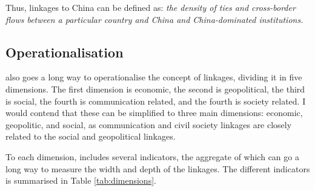 Thus, linkages to China can be defined as: \textit{the density of ties and cross-border flows between a particular country and China and China-dominated institutions.}

\subsection{Operationalisation}
\citet{levitsky_linkage_2006} also goes a long way to operationalise the concept of linkages, dividing it in five dimensions. The first dimension is economic, the second is geopolitical, the third is social, the fourth is communication related, and the fourth is society related. I would contend that these can be simplified to three main dimensions: economic, geopolitic, and social, as communication and civil society linkages are closely related to the social and geopolitical linkages. 

To each dimension, \citet{levitsky_linkage_2006} includes several indicators, the aggregate of which can go a long way to measure the width and depth of the linkages. The different indicators is summarised in Table \ref{tab:dimensions}. 

\begin{table}[hbt!]
\centering
\caption{Five dimensions of linkages}
\label{tab:dimensions}
\end{table}

